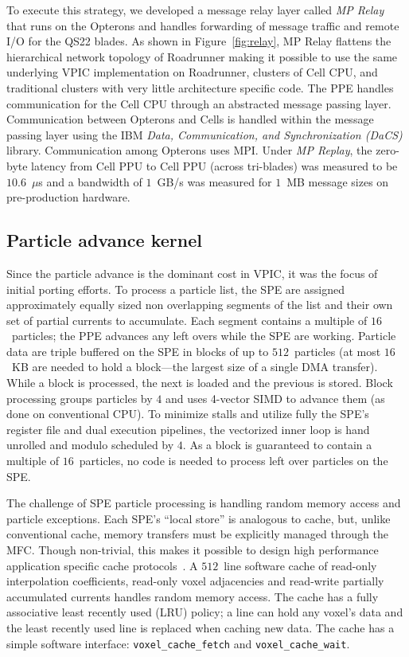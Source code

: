 \documentclass[journal,twoside]{IEEEtran}
\newcommand{\fig}[1]{Figure~\ref{fig:#1}}
\begin{document}
To execute this strategy, we developed a message relay layer called
\emph{MP Relay} that runs on the Opterons and handles forwarding of
message traffic and remote I/O for the QS22 blades.  As shown in
\fig{relay}, MP Relay flattens the hierarchical network topology of
Roadrunner making it possible to use the same underlying VPIC
implementation on Roadrunner, clusters of Cell CPU, and traditional
clusters with very little architecture specific code.  The PPE handles
communication for the Cell CPU through an abstracted message passing
layer.  Communication between Opterons and Cells is handled within the
message passing layer using the IBM \emph{Data, Communication, and
Synchronization (DaCS)} library.  Communication among Opterons uses
MPI.  Under \emph{MP Replay}, the zero-byte latency from Cell PPU to
Cell PPU (across tri-blades) was measured to be $10.6$~$\mu$s and a
bandwidth of $1$~GB/s was measured for $1$~MB message sizes on
pre-production hardware.

\subsection{Particle advance kernel}

Since the particle advance is the dominant cost in VPIC, it was the
focus of initial porting efforts.  To process a particle list, the SPE
are assigned approximately equally sized non overlapping segments of
the list and their own set of partial currents to accumulate.  Each
segment contains a multiple of $16$~particles; the PPE advances any
left overs while the SPE are working.  Particle data are triple
buffered on the SPE in blocks of up to $512$~particles (at most
$16$~KB are needed to hold a block---the largest size of a single DMA
transfer).  While a block is processed, the next is loaded and the
previous is stored.  Block processing groups particles by $4$ and uses
4-vector SIMD to advance them (as done on conventional CPU).  To
minimize stalls and utilize fully the SPE's register file and dual
execution pipelines, the vectorized inner loop is hand unrolled and
modulo scheduled by $4$.  As a block is guaranteed to contain a
multiple of $16$~particles, no code is needed to process left over
particles on the SPE.

The challenge of SPE particle processing is handling random memory
access and particle exceptions.  Each SPE's ``local store'' is
analogous to cache, but, unlike conventional cache, memory transfers
must be explicitly managed through the MFC.  Though non-trivial, this
makes it possible to design high performance application specific
cache protocols~\cite{Kahle_et_al_2005}.  A $512$~line software cache
of read-only interpolation coefficients, read-only voxel adjacencies
and read-write partially accumulated currents handles random memory
access.  The cache has a fully associative least recently used (LRU)
policy; a line can hold any voxel's data and the least recently used
line is replaced when caching new data.  The cache has a simple
software interface: \verb+voxel_cache_fetch+ and
\verb+voxel_cache_wait+.
\end{document}
